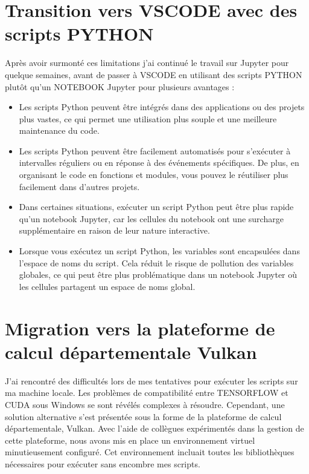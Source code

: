 \documentclass{report}
\begin{document}
{\section{Transition vers VSCODE avec des scripts PYTHON}    
    \hspace{1.6cm}Après avoir surmonté ces limitations j'ai continué le travail sur Jupyter pour quelque semaines, avant de passer à VSCODE\cite{vscode} en utilisant des scripts PYTHON plutôt qu'un NOTEBOOK Jupyter pour plusieurs avantages :
    
  
    
        \begin{itemize}
            \item Les scripts Python peuvent être intégrés dans des applications ou des projets plus vastes, ce qui permet une utilisation plus souple et une meilleure maintenance du code.
            \item Les scripts Python peuvent être facilement automatisés pour s'exécuter à intervalles réguliers ou en réponse à des événements spécifiques. De plus, en organisant le code en fonctions et modules, vous pouvez le réutiliser plus facilement dans d'autres projets.
            \item Dans certaines situations, exécuter un script Python peut être plus rapide qu'un notebook Jupyter, car les cellules du notebook ont une surcharge supplémentaire en raison de leur nature interactive.
            \item Lorsque vous exécutez un script Python, les variables sont encapsulées dans l'espace de noms du script. Cela réduit le risque de pollution des variables globales, ce qui peut être plus problématique dans un notebook Jupyter où les cellules partagent un espace de noms global.
        \end{itemize}

\section{Migration vers la plateforme de calcul départementale Vulkan }   
    \hspace{1.6cm}J'ai rencontré des difficultés lors de mes tentatives pour exécuter les scripts sur ma machine locale. Les problèmes de compatibilité entre TENSORFLOW et CUDA sous Windows se sont révélés complexes à résoudre. Cependant, une solution alternative s'est présentée sous la forme de la plateforme de calcul départementale, Vulkan. Avec l'aide de collègues expérimentés dans la gestion de cette plateforme, nous avons mis en place un environnement virtuel minutieusement configuré. Cet environnement incluait toutes les bibliothèques nécessaires pour exécuter sans encombre mes scripts.
    
}
\end{document}
